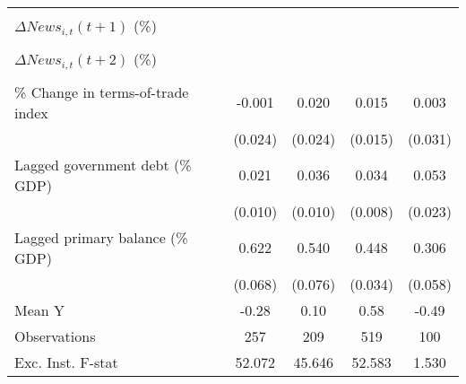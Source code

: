 {\begin{tabular}{l*{4}{c}}
                    &                     &                     &                     &                     \\
\addlinespace
$ \Delta News_{i,t}(t+1)$ (\%)&                     &                     &                     &                     \\
                    &                     &                     &                     &                     \\
\addlinespace
$ \Delta News_{i,t}(t+2)$ (\%)&                     &                     &                     &                     \\
                    &                     &                     &                     &                     \\
\addlinespace
\% Change in terms-of-trade index&      -0.001         &       0.020         &       0.015         &       0.003         \\
                    &     (0.024)         &     (0.024)         &     (0.015)         &     (0.031)         \\
\addlinespace
Lagged government debt (\% GDP)&       0.021\sym{**} &       0.036\sym{***}&       0.034\sym{***}&       0.053\sym{**} \\
                    &     (0.010)         &     (0.010)         &     (0.008)         &     (0.023)         \\
\addlinespace
Lagged primary balance (\% GDP)&       0.622\sym{***}&       0.540\sym{***}&       0.448\sym{***}&       0.306\sym{***}\\
                    &     (0.068)         &     (0.076)         &     (0.034)         &     (0.058)         \\
\midrule
Mean Y              &       -0.28         &        0.10         &        0.58         &       -0.49         \\
Observations        &         257         &         209         &         519         &         100         \\
Exc. Inst. F-stat   &      52.072         &      45.646         &      52.583         &       1.530         \\
\bottomrule
\end{tabular}
}
